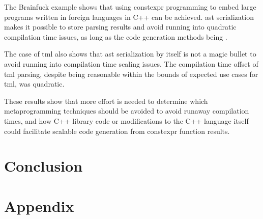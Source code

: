 \documentclass[english,12pt,a4paper]{book}
\providecommand{\cpp}{\textsc{C++}\xspace}
\begin{document}
The Brainfuck example shows that using \gls{constexpr} programming to embed
large programs written in foreign languages in \cpp can be achieved.
\gls{ast} serialization makes it possible to store parsing results
and avoid running into quadratic compilation time issues, as long as
the code generation methods being .

The case of \gls{tml} also shows that \gls{ast} serialization
by itself is not a magic bullet to avoid running into compilation time
scaling issues.
The compilation time offset of \gls{tml} parsing, despite being reasonable
within the bounds of expected use cases for \gls{tml}, was quadratic.

These results show that more effort is needed to determine which metaprogramming
techniques should be avoided to avoid runaway compilation times,
and how \cpp library code or modifications to the \cpp language itself
could facilitate scalable code generation from \gls{constexpr} function results.

\chapter*{Conclusion}



\clearpage
\printglossaries

\clearpage
\printbibliography

\chapter{Appendix}

\appendix


\end{document}
